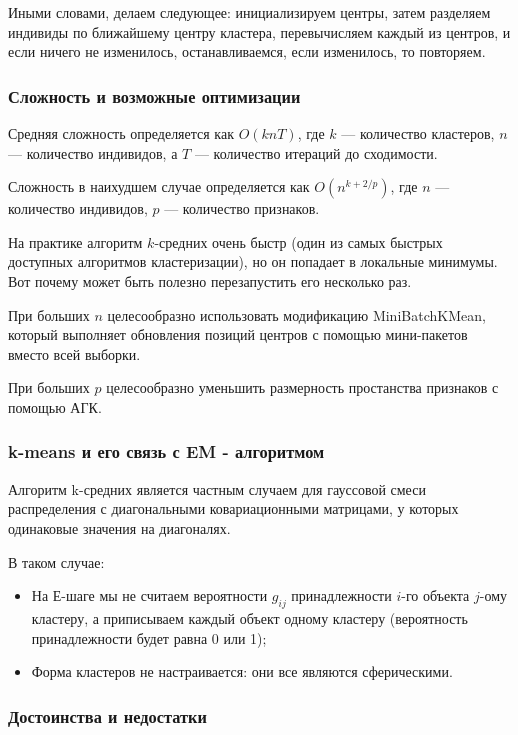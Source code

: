 \documentclass[10pt]{article}
\begin{document}
	Иными словами, делаем следующее: инициализируем центры, затем разделяем индивиды по ближайшему центру кластера, перевычисляем каждый из центров, и если ничего не изменилось, останавливаемся, если изменилось, то повторяем.
	
	\subsubsection*{Сложность и возможные оптимизации}
	
	Средняя сложность определяется как $O(k n T)$, где $k$ --- количество кластеров, $n$ --- количество индивидов, а $T$ --- количество итераций до сходимости.
	
	Сложность в наихудшем случае определяется как $O(n^{k+2/p})$, где $n$ --- количество индивидов, $p$ --- количество признаков.
	
	На практике алгоритм $k$-средних очень быстр (один из самых быстрых доступных алгоритмов кластеризации), но он попадает в локальные минимумы. Вот почему может быть полезно перезапустить его несколько раз.
	
	При больших $n$ целесообразно использовать модификацию MiniBatchKMean, который выполняет обновления позиций центров с помощью мини-пакетов вместо всей выборки.
	
	При  больших $p$ целесообразно уменьшить размерность простанства признаков с помощью АГК.
	
	\subsubsection*{k-means и его связь с EM - алгоритмом}
	
	
	 Алгоритм k-средних является частным случаем для гауссовой смеси распределения с диагональными ковариационными матрицами, у которых одинаковые значения на диагоналях.
	
	В таком случае:
	\begin{itemize}
		\item На Е-шаге мы не считаем вероятности $g_{ij}$ принадлежности $i$-го объекта $j$-ому кластеру, а приписываем каждый объект одному кластеру (вероятность принадлежности будет равна 0 или 1);
		\item Форма кластеров не настраивается: они все являются сферическими.
	\end{itemize}
	
	\subsubsection*{Достоинства и недостатки}
	
\end{document}
